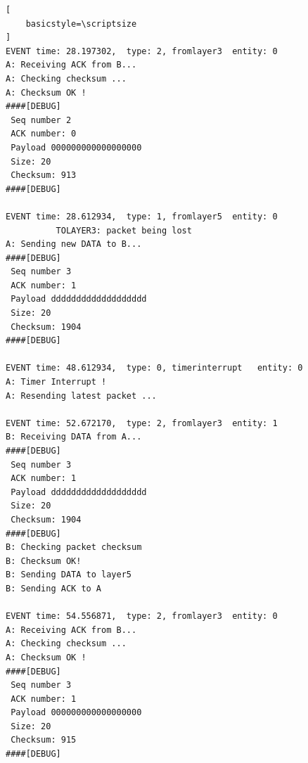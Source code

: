 \documentclass[a4paper]{article}
\begin{document}
\begin{lstlisting}[
    basicstyle=\scriptsize 
]
EVENT time: 28.197302,  type: 2, fromlayer3  entity: 0
A: Receiving ACK from B...
A: Checking checksum ...
A: Checksum OK !
####[DEBUG]
 Seq number 2
 ACK number: 0
 Payload 000000000000000000
 Size: 20
 Checksum: 913
####[DEBUG]

EVENT time: 28.612934,  type: 1, fromlayer5  entity: 0
          TOLAYER3: packet being lost
A: Sending new DATA to B...
####[DEBUG]
 Seq number 3
 ACK number: 1
 Payload ddddddddddddddddddd
 Size: 20
 Checksum: 1904
####[DEBUG]

EVENT time: 48.612934,  type: 0, timerinterrupt   entity: 0
A: Timer Interrupt !
A: Resending latest packet ...

EVENT time: 52.672170,  type: 2, fromlayer3  entity: 1
B: Receiving DATA from A...
####[DEBUG]
 Seq number 3
 ACK number: 1
 Payload ddddddddddddddddddd
 Size: 20
 Checksum: 1904
####[DEBUG]
B: Checking packet checksum
B: Checksum OK!
B: Sending DATA to layer5
B: Sending ACK to A

EVENT time: 54.556871,  type: 2, fromlayer3  entity: 0
A: Receiving ACK from B...
A: Checking checksum ...
A: Checksum OK !
####[DEBUG]
 Seq number 3
 ACK number: 1
 Payload 000000000000000000
 Size: 20
 Checksum: 915
####[DEBUG]
\end{lstlisting}
\end{document}

